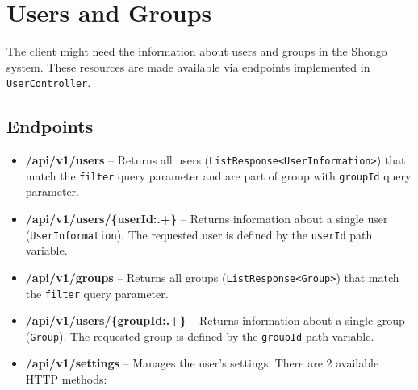 \section{Users and Groups}
The client might need the information about users and groups in the Shongo system.
These resources are made available via endpoints implemented in \texttt{UserController}.

\subsection{Endpoints}
\begin{itemize}
    \item \textbf{\text{[GET]} /api/v1/users} -- Returns all users (\texttt{ListResponse<UserInformation>}) that match the \texttt{filter} query parameter and are part of group with \texttt{groupId} query parameter.
    \item \textbf{\text{[GET]} /api/v1/users/\{userId:.+\}} -- Returns information about a single user (\texttt{UserInformation}). The requested user is defined by the \texttt{userId} path variable.
    \item \textbf{\text{[GET]} /api/v1/groups} -- Returns all groups (\texttt{ListResponse<Group>}) that match the \texttt{filter} query parameter.
    \item \textbf{\text{[GET]} /api/v1/users/\{groupId:.+\}} -- Returns information about a single group (\texttt{Group}). The requested group is defined by the \texttt{groupId} path variable.
    \item \textbf{/api/v1/settings} -- Manages the user's settings. There are 2 available HTTP methods:
\end{itemize}
